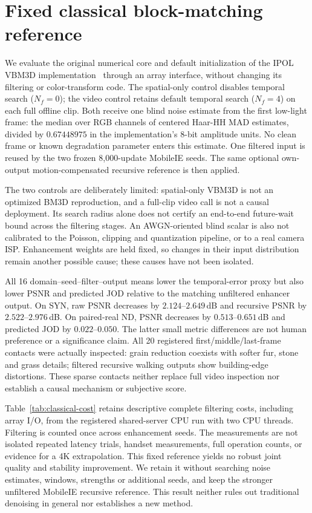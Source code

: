 \section{Fixed classical block-matching reference}
\label{sec:classical-reference}
We evaluate the original numerical core and default initialization of the
IPOL VBM3D implementation~\cite{vbm3d_ipol} through an array interface,
without changing its filtering or color-transform code. The spatial-only
control disables temporal search ($N_f=0$); the video control retains
default temporal search ($N_f=4$) on each full offline clip. Both receive
one blind noise estimate from the first low-light frame: the median over
RGB channels of centered Haar-HH MAD estimates, divided by $0.67448975$
in the implementation's 8-bit amplitude units. No clean frame or known
degradation parameter enters this estimate. One filtered input is reused
by the two frozen 8,000-update MobileIE seeds. The same optional
own-output motion-compensated recursive reference is then applied.



The two controls are deliberately limited: spatial-only VBM3D is not an
optimized BM3D reproduction, and a full-clip video call is not a causal
deployment. Its search radius alone does not certify an end-to-end
future-wait bound across the filtering stages. An AWGN-oriented blind
scalar is also not calibrated to the Poisson, clipping and quantization
pipeline, or to a real camera ISP. Enhancement weights are held fixed,
so changes in their input distribution remain another possible cause;
these causes have not been isolated.

All 16 domain--seed--filter--output means lower the temporal-error proxy
but also lower PSNR and predicted JOD relative to the matching unfiltered
enhancer output. On SYN, raw PSNR decreases by $2.124$--$2.649$\,dB and
recursive PSNR by $2.522$--$2.976$\,dB. On paired-real ND, PSNR decreases
by $0.513$--$0.651$\,dB and predicted JOD by $0.022$--$0.050$.
The latter small metric differences are not human preference or a
significance claim. All 20 registered first/middle/last-frame contacts
were actually inspected: grain reduction coexists with softer fur,
stone and grass details; filtered recursive walking outputs show
building-edge distortions. These sparse contacts neither replace full
video inspection nor establish a causal mechanism or subjective score.



Table~\ref{tab:classical-cost} retains descriptive complete filtering
costs, including array I/O, from the registered shared-server CPU run
with two CPU threads. Filtering is counted once across enhancement
seeds. The measurements are not isolated repeated latency trials,
handset measurements, full operation counts, or evidence for a 4K
extrapolation. This fixed reference yields no robust joint quality and
stability improvement. We retain it without searching noise estimates,
windows, strengths or additional seeds, and keep the stronger
unfiltered MobileIE recursive reference. This result neither rules out
traditional denoising in general nor establishes a new method.
